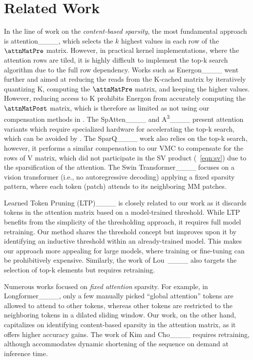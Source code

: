\section{Related Work}
\label{sec:related_work}
%

%
In the line of work on the \textit{content-based sparsity}, the most fundamental approach is \topk attention____, which selects the  $k$ highest values in each row of the $\attnMatPre$ matrix. However, in practical kernel implementations, where the attention rows are tiled, it is highly difficult to implement the top-k search algorithm due to the full row dependency. Works such as Energon____ went further and aimed at reducing the reads from the K-cached matrix by iteratively quantizing K, computing the $\attnMatPre$ matrix, and keeping the higher values. However, reducing access to K prohibits Energon from accurately computing the $\attnMatPost$ matrix, which is therefore as limited as not using our compensation methods in \topth. The SpAtten____ and A\textsuperscript{3}____ present \topk attention variants which require specialized hardware for accelerating the top-k search, which can be avoided by \topth. The SparQ____ work also relies on the top-k search, however, it performs a similar compensation to our VMC to compensate for the rows of V matrix, which did not participate in the SV product (~\ref{eqn:sv}) due to the sparsification of the attention. The Swin Transformer____ focuses on a vision transformer (i.e., no autoregressive decoding) applying a fixed sparsity pattern, where each token (patch) attends to its neighboring M\texttimes M patches.
%

%
Learned Token Pruning (LTP)____ is closely related to our work as it discards tokens in the attention matrix based on a model-trained threshold. While LTP benefits from the simplicity of the thresholding approach, it requires full model retraining. Our method shares the threshold concept but improves upon it by identifying an inductive threshold within an already-trained model. This makes our approach more appealing for large models, where training or fine-tuning can be prohibitively expensive. Similarly, the work of Lou~\etal____ also targets the selection of top-k elements but requires retraining.
%

%
Numerous works focused on \textit{fixed attention} sparsity. For example, in Longformer____, only a few manually picked ``global attention'' tokens are allowed to attend to other tokens, whereas other tokens are restricted to the neighboring tokens in a dilated sliding window. Our work, on the other hand, capitalizes on identifying content-based sparsity in the attention matrix, as it offers higher accuracy gains. The work of Kim and Cho____ requires retraining, although accommodates dynamic shortening of the sequence on demand at inference time.
%

